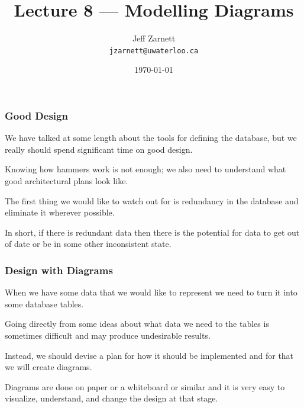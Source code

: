 

\title{Lecture 8 ---  Modelling Diagrams}

\author{Jeff Zarnett \\ \small \texttt{jzarnett@uwaterloo.ca}}
\date{\today}




\begin{frame}
  \titlepage

 \end{frame}


\begin{frame}
\frametitle{Good Design}

We have talked at some length about the tools for defining the database, but we really should spend significant time on good design. 

Knowing how hammers work is not enough; we also need to understand what good architectural plans look like.

The first thing we would like to watch out for is redundancy in the database and eliminate it wherever possible. 

In short, if there is redundant data then there is the potential for data to get out of date or be in some other inconsistent state. 

\end{frame}



\begin{frame}
\frametitle{Design with Diagrams}

When we have some data that we would like to represent we need to turn it into some database tables. 

Going directly from some ideas about what data we need to the tables is sometimes difficult and may produce undesirable results. 

Instead, we should devise a plan for how it should be implemented and for that we will create diagrams. 

Diagrams are done on paper or a whiteboard or similar and it is very easy to visualize, understand, and change the design at that stage.


\end{frame}



